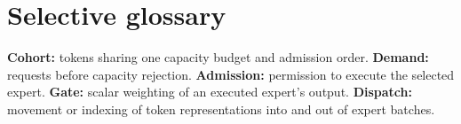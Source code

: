 \section*{Selective glossary}
\textbf{Cohort:} tokens sharing one capacity budget and admission order.
\textbf{Demand:} requests before capacity rejection.
\textbf{Admission:} permission to execute the selected expert.
\textbf{Gate:} scalar weighting of an executed expert's output.
\textbf{Dispatch:} movement or indexing of token representations into and out of expert batches.
